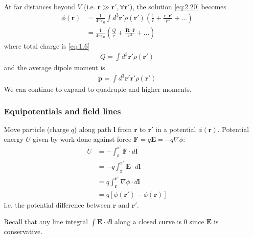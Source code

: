 \documentclass[a4paper]{article}
\begin{document}
At far distances beyond $V$ (i.e. $\mathbf{r} \gg \mathbf{r'}, \forall \mathbf{r'}$), the solution \eqref{eq:2.20} becomes
\begin{equation*}\tag{2.22} \label{eq:2.22}
\begin{aligned}
\phi(\mathbf{r}) &= \frac{1}{4\pi \varepsilon_0} \int d^3 \mathbf{r'} \rho(\mathbf{r'}) \left(\frac{1}{r} + \frac{\mathbf{r} \cdot \mathbf{r'}}{r^3} + ...\right)\\
&= \frac{1}{4\pi \varepsilon_0} \left(\frac{Q}{r} + \frac{\mathbf{R} \cdot \hat{\mathbf{r}}}{r^2} + ...\right)
\end{aligned}
\end{equation*}
where total charge is \eqref{eq:1.6}
\begin{equation*}
\begin{aligned}
Q=\int d^3\mathbf{r'} \rho(\mathbf{r'})
\end{aligned}
\end{equation*}
and the average dipole moment is
\begin{equation*}\tag{2.23} \label{eq:2.23}
\begin{aligned}
\mathbf{p} = \int d^3 \mathbf{r'} \mathbf{r'} \rho(\mathbf{r}')
\end{aligned}
\end{equation*}
We can continue to expand to quadruple and higher moments.

\subsubsection{Equipotentials and field lines}
Move particle (charge $q$) along path $\mathbf{l}$ from $\mathbf{r}$ to $\mathbf{r'}$ in a potential $\phi(\mathbf{r})$. Potential energy $U$ given by work done against force $\mathbf{F} = q\mathbf{E} =-q\nabla \phi$:
\begin{equation*}\tag{2.24} \label{eq:2.24}
\begin{aligned}
U &= -\int_\mathbf{r}^\mathbf{r'} \mathbf{F} \cdot d\mathbf{l}\\
&= -q\int_\mathbf{r}^\mathbf{r'} \mathbf{E}\cdot d\mathbf{l}\\
&= q\int_\mathbf{r}^\mathbf{r'} \nabla\phi \cdot d\mathbf{l}\\
&= q[\phi(\mathbf{r'}) - \phi(\mathbf{r})]
\end{aligned}
\end{equation*}
i.e. the potential difference between $\mathbf{r}$ and $\mathbf{r'}$.

Recall that any line integral $\int \mathbf{E} \cdot d\mathbf{l}$ along a closed curve is $0$ since $\mathbf{E}$ is conservative.
\end{document}
